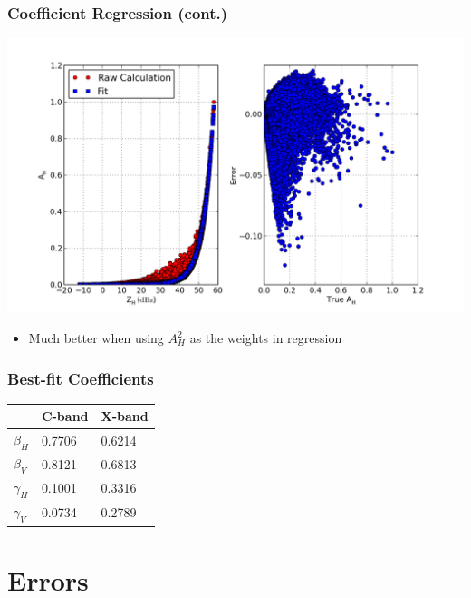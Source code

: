 \documentclass[red]{beamer}
\begin{document}
\begin{frame}
	\frametitle{Coefficient Regression (cont.)}
	\begin{center}
		\includegraphics[scale=0.35]{figures/weighted_power_law.png}
	\end{center}
	\begin{itemize}
		\item Much better when using $A_H^2$ as the weights in regression
	\end{itemize}
\end{frame}

\begin{frame}
	\frametitle{Best-fit Coefficients}
    \begin{center}
	    \begin{tabular}{ | l | l | l |}
	        \hline
	        & \textbf{C-band} & \textbf{X-band}\\
	        \hline\hline
	        $\beta_H$ &  \num{0.7706} & \num{0.6214} \\
	        $\beta_V$ &  \num{0.8121} & \num{0.6813} \\
	        $\gamma_H$ & \num{0.1001} & \num{0.3316} \\
	        $\gamma_V$ & \num{0.0734} & \num{0.2789} \\
	        \hline
	    \end{tabular}
	\end{center}
\end{frame}

\section{Errors}
\end{document}
